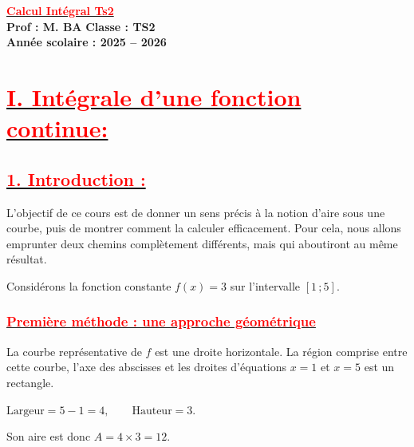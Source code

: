 \documentclass[12pt,a4paper]{article}
\begin{document}
\begin{center}
    \Large\textbf{\underline{\textcolor{red}{Calcul Intégral Ts2}}}\\[-0.1cm]
    \normalsize\textbf{Prof : M. BA} \hfill \textbf{Classe : TS2}\\[-0.1cm]
    \textbf{Année scolaire : 2025 -- 2026}
\end{center}

\section*{\underline{\textbf{\textcolor{red}{I. Intégrale d'une fonction continue: }}}}
\subsection*{\underline{\textbf{\textcolor{red}{1. Introduction :}}}}
L’objectif de ce cours est de donner un sens précis à la notion d’aire sous une courbe, puis de montrer comment la calculer efficacement. Pour cela, nous allons emprunter deux chemins complètement différents, mais qui aboutiront au même résultat.

Considérons la fonction constante \(f(x)=3\) sur l'intervalle \([1\,;5]\).

\subsubsection*{\underline{\textbf{\textcolor{red}{Première méthode : une approche géométrique}}}}

La courbe représentative de \(f\) est une droite horizontale. La région comprise entre cette courbe, l'axe des abscisses et les droites d'équations \(x=1\) et \(x=5\) est un rectangle.

\(
\text{Largeur}=5-1=4,
\qquad
\text{Hauteur}=3.
\)

Son aire est donc \(A=4\times3=12.\)

\begin{center}
\end{center}
\end{document}
